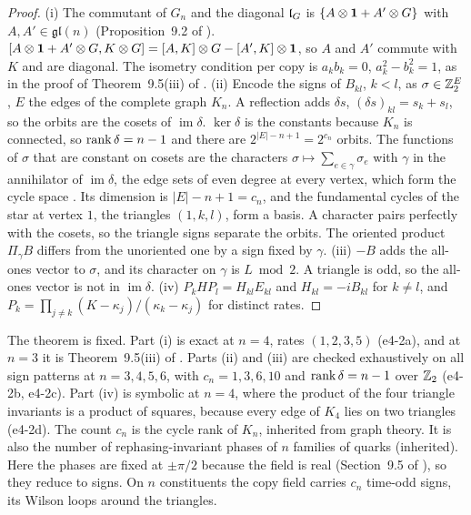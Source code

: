 \begin{proof}
(i) The commutant of $G_n$ and the diagonal $\mathfrak l_G$ is $\{A\otimes\mathbf 1+A'\otimes G\}$ with $A,A'\in\mathfrak{gl}(n)$ (Proposition~9.2 of \cite{RE}).
$[A\otimes\mathbf 1+A'\otimes G,K\otimes G]=[A,K]\otimes G-[A',K]\otimes\mathbf 1$, so $A$ and $A'$ commute with $K$ and are diagonal. The isometry condition per copy is
$a_kb_k=0$, $a_k^2-b_k^2=1$, as in the proof of Theorem~9.5(iii) of \cite{RE}. (ii) Encode the signs of $B_{kl}$, $k<l$, as $\sigma\in\mathbb{Z}_2^E$, $E$ the
edges of the complete graph $K_n$. A reflection adds $\delta s$, $(\delta s)_{kl}=s_k+s_l$, so the orbits are the cosets of $\operatorname{im}\delta$.
$\ker\delta$ is the constants because $K_n$ is connected, so $\operatorname{rank}\delta=n-1$ and there are $2^{|E|-n+1}=2^{c_n}$ orbits. The functions of $\sigma$ that are
constant on cosets are the characters $\sigma\mapsto\sum_{e\in\gamma}\sigma_e$ with $\gamma$ in the annihilator of $\operatorname{im}\delta$, the edge sets of even
degree at every vertex, which form the cycle space \cite{Diestel17}. Its dimension is $|E|-n+1=c_n$, and the fundamental cycles of the star at
vertex $1$, the triangles $(1,k,l)$, form a basis. A character pairs perfectly with the cosets, so the triangle signs separate the orbits. The
oriented product $\Pi_\gamma B$ differs from the unoriented one by a sign fixed by $\gamma$. (iii) $-B$ adds the all-ones vector to $\sigma$, and its
character on $\gamma$ is $L\bmod2$. A triangle is odd, so the all-ones vector is not in $\operatorname{im}\delta$. (iv) $P_kHP_l=H_{kl}E_{kl}$ and
$H_{kl}=-iB_{kl}$ for $k\neq l$, and $P_k=\prod_{j\neq k}(K-\kappa_j)/(\kappa_k-\kappa_j)$ for distinct rates.
\end{proof}

The theorem is fixed. Part (i) is exact at $n=4$, rates $(1,2,3,5)$ (e4-2a), and at $n=3$ it is Theorem~9.5(iii) of \cite{RE}. Parts (ii) and (iii)
are checked exhaustively on all sign patterns at $n=3,4,5,6$, with $c_n=1,3,6,10$ and $\operatorname{rank}\delta=n-1$ over $\mathbb{Z}_2$ (e4-2b, e4-2c). Part (iv) is
symbolic at $n=4$, where the product of the four triangle invariants is a product of squares, because every edge of $K_4$ lies on two
triangles (e4-2d). The count $c_n$ is the cycle rank of $K_n$, inherited from graph theory. It is also the number of rephasing-invariant phases of $n$
families of quarks \cite{KobayashiMaskawa73,BrancoLavouraSilva99} (inherited). Here the phases are fixed at $\pm\pi/2$ because the field is real
(Section~9.5 of \cite{RE}), so they reduce to signs. On $n$ constituents the copy field carries $c_n$ time-odd signs, its Wilson loops around the
triangles.

